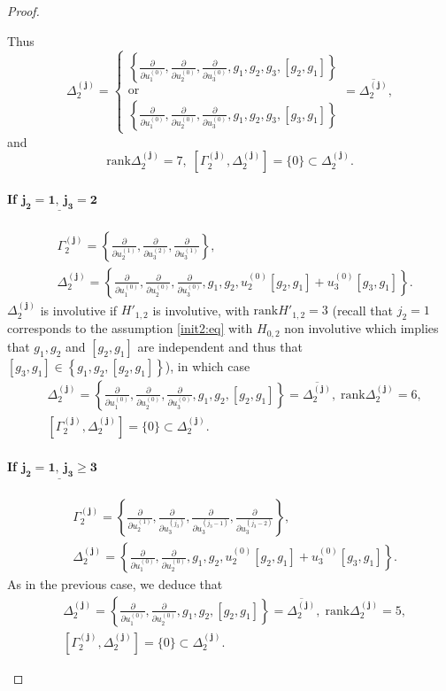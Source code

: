\documentclass[10pt]{article}
\newcommand{\3}{\mathbf{3}}
\newcommand{\2}{\mathbf{2}}
\newcommand{\1}{\mathbf{1}}
\newcommand{\0}{\mathbf{0}}
\newcommand{\mbf}[1]{\mathbf{#1}}
\newcommand{\rk}{\mathrm{rank}}
\newcommand{\ddu}[2]{\frac{\partial}{\partial u_{#1}^{(#2)}}}
\newcommand{\ol}[1]{\overline{#1}}
\begin{document}
\begin{proof}
\begin{enumerate}
Thus
$$\Delta_{2}^{(\mbf{j})} = \left\{ \begin{array}{l}
\left\{\ddu{1}{0}, \ddu{2}{0}, \ddu{3}{0},  g_{1}, g_{2}, g_{3}, [g_{2},g_{1}]\right\}\\
\mathrm{or}\\
\left\{\ddu{1}{0}, \ddu{2}{0}, \ddu{3}{0},  g_{1}, g_{2}, g_{3}, [g_{3},g_{1}]\right\}
\end{array}\right.
= \ol{\Delta_{2}^{(\mbf{j})}},
$$
and
$$ \rk \Delta_{2}^{(\mbf{j})} =7, \; [\Gamma_{2}^{(\mbf{j})}, \Delta_{2}^{(\mbf{j})}] = \{ 0 \} \subset \Delta_{2}^{(\mbf{j})}.$$


\paragraph{If $\underline{\mathbf{j_{2}=1,~ j_{3} =2}}$}
$$\begin{aligned}
&\Gamma_{2}^{(\mbf{j})} = \left\{ \ddu{2}{1}, \ddu{3}{2}, \ddu{3}{1} \right\}, \\
&\Delta_{2}^{(\mbf{j})} = \left\{\ddu{1}{0}, \ddu{2}{0}, \ddu{3}{0}, g_{1}, g_{2},  u_{2}^{(0)}[g_{2},g_{1}]+ u_{3}^{(0)}[g_{3},g_{1}] \right\}.
\end{aligned}$$
$\Delta_{2}^{(\mbf{j})}$ is involutive if $H'_{1,2}$ is involutive, with $\rk H'_{1,2}  = 3$ (recall that $j_{2}=1$ corresponds to the assumption \eqref{init2:eq} with $H_{0,2}$ non involutive which implies that $g_{1}, g_{2}$ and $[g_{2},g_{1}]$ are independent and thus that $[g_{3},g_{1}] \in \left\{g_{1}, g_{2}, [g_{2},g_{1}]\right\}$), in which case
$$\begin{aligned}&\Delta_{2}^{(\mbf{j})} = \left\{\ddu{1}{0}, \ddu{2}{0}, \ddu{3}{0},  g_{1}, g_{2}, [g_{2},g_{1}]\right\} = \ol{\Delta_{2}^{(\mbf{j})}}, \;  \rk \Delta_{2}^{(\mbf{j})} = 6, \\  &[\Gamma_{2}^{(\mbf{j})}, \Delta_{2}^{(\mbf{j})}] = \{ 0 \} \subset \Delta_{2}^{(\mbf{j})}.\end{aligned}$$


\paragraph{If $\underline{\mathbf{j_{2}=1,~ j_{3} \geq 3}}$}


$$\begin{aligned}
&\Gamma_{2}^{(\mbf{j})} = \left\{ \ddu{2}{1}, \ddu{3}{j_{3}}, \ddu{3}{j_{3}-1}, \ddu{3}{j_{3}-2} \right\}, \\
&\Delta_{2}^{(\mbf{j})} = \left\{\ddu{1}{0}, \ddu{2}{0}, g_{1}, g_{2},  u_{2}^{(0)}[g_{2},g_{1}]+ u_{3}^{(0)}[g_{3},g_{1}] \right\}.
\end{aligned}$$
As in the previous case, we deduce that
$$\begin{aligned}&\Delta_{2}^{(\mbf{j})} = \left\{\ddu{1}{0}, \ddu{2}{0},  g_{1}, g_{2}, [g_{2},g_{1}]\right\} = \ol{\Delta_{2}^{(\mbf{j})}}, \; \rk \Delta_{2}^{(\mbf{j})} = 5, \\ &[\Gamma_{2}^{(\mbf{j})}, \Delta_{2}^{(\mbf{j})}] = \{ 0 \} \subset \Delta_{2}^{(\mbf{j})}.\end{aligned}$$


\end{enumerate}
\end{proof}
\end{document}

